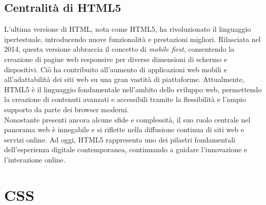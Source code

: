 \subsection{Centralità di HTML5}

L’ultima versione di HTML, nota come HTML5, ha rivoluzionato il linguaggio ipertestuale, introducendo nuove funzionalità e prestazioni migliori. Rilasciata nel 2014, questa versione abbraccia il concetto di \textit{mobile first}, consentendo la creazione di pagine web responsive per diverse dimensioni di schermo e dispositivi. Ciò ha contribuito all’aumento di applicazioni web mobili e all’adattabilità dei siti web su una gran vastità di piattaforme. Attualmente, HTML5 è il linguaggio fondamentale nell’ambito dello sviluppo web,\cite{HTML_tokioschool} permettendo la creazione di contenuti avanzati e accessibili tramite la flessibilità e l’ampio supporto da parte dei browser moderni.\\
Nonostante presenti ancora alcune sfide e complessità, il suo ruolo centrale nel panorama web è innegabile e si riflette nella diffusione continua di siti web e servizi online. Ad oggi, HTML5 rappresenta uno dei pilastri fondamentali dell’esperienza digitale contemporanea, continuando a guidare l'innovazione e l'interazione online.

\section{CSS}

